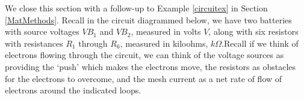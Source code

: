 \documentclass{ximera}
\begin{document}
We close this section with a follow-up to Example \ref{circuitex} in Section \ref{MatMethods}.  Recall in the circuit diagrammed below, we have two batteries with source voltages $V\!B_1$ and $V\!B_2$, measured in volts $V$, along with six resistors with resistances $R_1$ through $R_6$, measured in kiloohms, $k\Omega$.Recall if we think of electrons flowing through the circuit, we can think of the voltage sources as providing the `push' which makes the electrons move, the resistors as obstacles for the electrons to overcome, and the mesh current as a net rate of flow of electrons around the indicated loops.


\begin{image}
\end{image}
\end{document}
